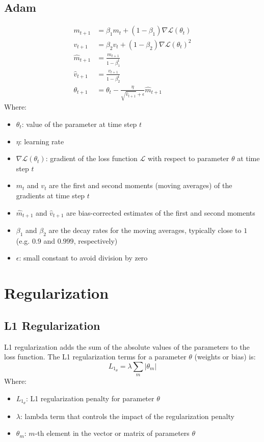 \documentclass[a4paper]{article}
\newcommand{\abs}[1]{\lvert#1\rvert}
\newcommand{\ELL}{\mathcal{L}}
\begin{document}
\subsection*{Adam}
\begin{align*}
    m_{t+1} &= \beta_1 m_t + (1-\beta_1) \nabla\ELL(\theta_t) \\
    v_{t+1} &= \beta_2 v_t + (1-\beta_2) \nabla\ELL(\theta_t)^2\\
    \hat{m}_{t+1} &= \frac{m_{t+1}}{1-\beta_1^t}\\
    \hat{v}_{t+1} &= \frac{v_{t+1}}{1-\beta_2^t}\\
    \theta_{t+1} &= \theta_t - \frac{\eta}{\sqrt{\hat{v}_{t+1}}+\epsilon} \hat{m}_{t+1}
\end{align*}
Where:
\begin{itemize}
    \item $\theta_t$: value of the parameter at time step $t$
    \item $\eta$: learning rate
    \item $\nabla\ELL(\theta_t)$: gradient of the loss function $\ELL$ with respect to parameter $\theta$ at time step $t$
    \item $m_t$ and $v_t$ are the first and second moments (moving averages) of the gradients at time step $t$
    \item $\hat{m}_{t+1}$ and $\hat{v}_{t+1}$ are bias-corrected estimates of the first and second moments
    \item $\beta_1$ and $\beta_2$ are the decay rates for the moving averages, typically close to $1$ (e.g. $0.9$ and $0.999$, respectively)
    \item $\epsilon$: small constant to avoid division by zero
\end{itemize}

\pagebreak
\section*{Regularization}

\subsection*{L1 Regularization}
L1 regularization adds the sum of the absolute values of the parameters to the loss function. The L1 regularization terms for a parameter $\theta$ (weights or bias) is:
\begin{equation*}
    L_{1_\theta} = \lambda \sum_m \abs{\theta_m}
\end{equation*}
Where:
\begin{itemize}
    \item $L_{1_\theta}$: L1 regularization penalty for parameter $\theta$
    \item $\lambda$: lambda term that controls the impact of the regularization penalty
    \item $\theta_m$: $m$-th element in the vector or matrix of parameters $\theta$
\end{itemize}
\end{document}
